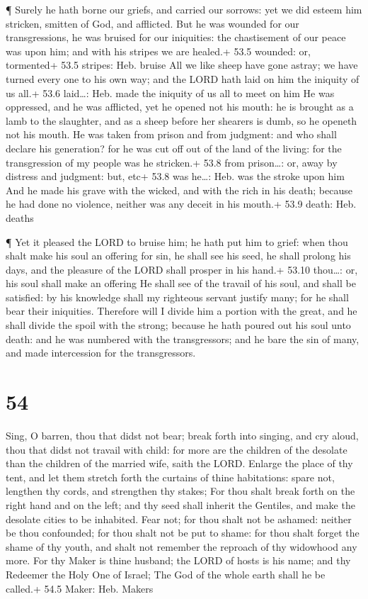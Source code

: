  ¶ Surely he hath borne our griefs, and carried our sorrows:
yet we did esteem him stricken, smitten of God, and afflicted.
 But he was wounded for our transgressions, he was bruised
for our iniquities: the chastisement of our peace was upon him; and with
his stripes we are healed.+ 53.5 wounded: or, tormented+ 53.5 stripes:
Heb. bruise  All we like sheep have gone astray; we have
turned every one to his own way; and the LORD hath laid on him the
iniquity of us all.+ 53.6 laid\ldots: Heb. made the iniquity of us all
to meet on him  He was oppressed, and he was afflicted, yet
he opened not his mouth: he is brought as a lamb to the slaughter, and
as a sheep before her shearers is dumb, so he openeth not his mouth.
 He was taken from prison and from judgment: and who shall
declare his generation? for he was cut off out of the land of the
living: for the transgression of my people was he stricken.+ 53.8 from
prison\ldots: or, away by distress and judgment: but, etc+ 53.8 was
he\ldots: Heb. was the stroke upon him  And he made his
grave with the wicked, and with the rich in his death; because he had
done no violence, neither was any deceit in his mouth.+ 53.9 death: Heb.
deaths

 ¶ Yet it pleased the LORD to bruise him; he hath put him
to grief: when thou shalt make his soul an offering for sin, he shall
see his seed, he shall prolong his days, and the pleasure of the LORD
shall prosper in his hand.+ 53.10 thou\ldots: or, his soul shall make an
offering  He shall see of the travail of his soul, and
shall be satisfied: by his knowledge shall my righteous servant justify
many; for he shall bear their iniquities.  Therefore will I
divide him a portion with the great, and he shall divide the spoil with
the strong; because he hath poured out his soul unto death: and he was
numbered with the transgressors; and he bare the sin of many, and made
intercession for the transgressors.

\hypertarget{section-53}{%
\section{54}\label{section-53}}

 Sing, O barren, thou that didst not bear; break forth into
singing, and cry aloud, thou that didst not travail with child: for more
are the children of the desolate than the children of the married wife,
saith the LORD.  Enlarge the place of thy tent, and let them
stretch forth the curtains of thine habitations: spare not, lengthen thy
cords, and strengthen thy stakes;  For thou shalt break
forth on the right hand and on the left; and thy seed shall inherit the
Gentiles, and make the desolate cities to be inhabited. 
Fear not; for thou shalt not be ashamed: neither be thou confounded; for
thou shalt not be put to shame: for thou shalt forget the shame of thy
youth, and shalt not remember the reproach of thy widowhood any more.
 For thy Maker is thine husband; the LORD of hosts is his
name; and thy Redeemer the Holy One of Israel; The God of the whole
earth shall he be called.+ 54.5 Maker: Heb. Makers

